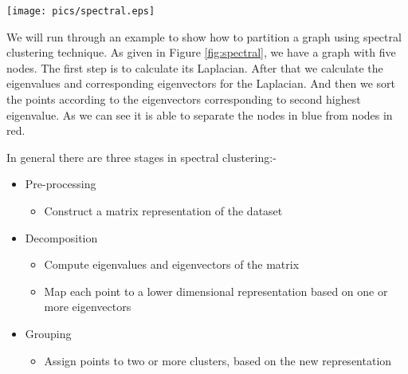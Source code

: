 \documentclass[letterpaper]{article}
\begin{document}
\begin{figure*}
\centering
\texttt{[image: pics/spectral.eps]}
\caption{This figure shows a graph with 5 nodes and its Laplacian and the
corresponding eigen values and eigen vectors} \label{fig:spectral}
\end{figure*}

We will run through an example to show how to partition a graph using spectral
clustering technique.  As given in Figure \ref{fig:spectral}, we have a graph with
five nodes. The first step is to calculate its Laplacian. After that we
calculate the eigenvalues and corresponding eigenvectors for the Laplacian. And
then we sort the points according to the eigenvectors corresponding to second
highest eigenvalue. As we can see it is able to separate the nodes in blue from
nodes in red.

In general there are three stages in spectral clustering:-
\begin{itemize}
\item Pre-processing
\begin{itemize}
\item Construct a matrix representation of the dataset
\end{itemize}
\item Decomposition
\begin{itemize}
\item Compute eigenvalues and eigenvectors of the matrix
\item Map each point to a lower dimensional representation based on one or more
eigenvectors
\end{itemize}
\item Grouping 
\begin{itemize}
\item Assign points to two or more clusters, based on the new representation
\end{itemize}
\end{itemize}
\end{document}
